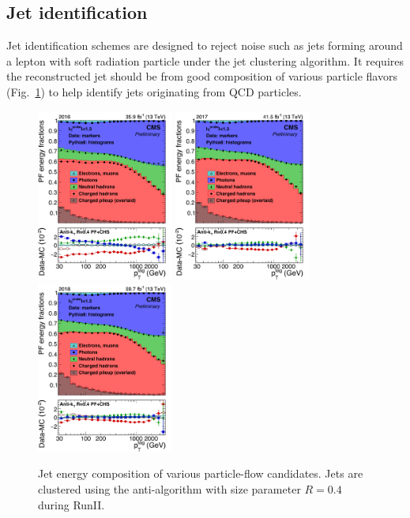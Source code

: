 \subsection{Jet identification}
Jet identification schemes are designed to reject noise such as jets forming around a lepton with soft radiation particle under the jet clustering algorithm.
It requires the reconstructed jet should be from good composition of various particle flavors (Fig.~\ref{fig:reco_jet}) to help identify jets originating from QCD particles.
\begin{figure}\centering
    \includegraphics[width=0.4\textwidth]{figure/reco_jet16.png}
    \includegraphics[width=0.4\textwidth]{figure/reco_jet17.png}
    \includegraphics[width=0.4\textwidth]{figure/reco_jet18.png}
    \caption[Jet energy composition of various particle-flow candidates.]
    {
        Jet energy composition of various particle-flow candidates.
        Jets are clustered using the anti-\kt algorithm with size parameter $R=0.4$ during RunII.
    }
    \label{fig:reco_jet}
\end{figure}

